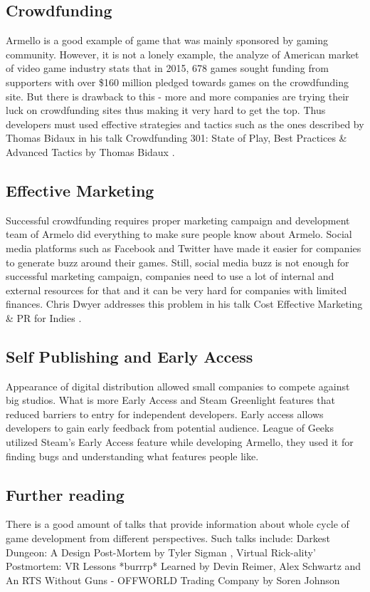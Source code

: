 \documentclass[a4paper]{article}
\begin{document}
\subsection{Crowdfunding}
Armello is a good example of game that was mainly sponsored by gaming community. However, it is not a lonely example, the analyze of American market of video game industry \cite{report} stats that in 2015, 678 games sought funding from supporters with over \$160 million pledged towards games on the crowdfunding site. But there is drawback to this - more and more companies are trying their luck on crowdfunding sites thus making it very hard to get the top. Thus developers must used effective strategies and tactics such as the ones described by Thomas Bidaux in his talk Crowdfunding 301: State of Play, Best Practices & Advanced Tactics by Thomas Bidaux \cite{talk0}.
\subsection{Effective Marketing}
Successful crowdfunding requires proper marketing campaign and development team of Armelo did everything to make sure people know about Armelo. Social media platforms such as Facebook and Twitter have made it easier for companies to generate buzz around their games. Still, social media buzz is not enough for successful marketing campaign, companies need to use a lot of internal and external resources for that and it can be very hard for companies with limited finances. Chris Dwyer addresses this problem in his talk Cost Effective Marketing & PR for Indies \cite{talk1}. 
\subsection{Self Publishing and Early Access}
Appearance of digital distribution allowed small companies to compete against big studios. What is more Early Access and Steam Greenlight features that reduced barriers to entry for
independent developers. Early access allows developers to gain early feedback from potential audience.  League of Geeks utilized Steam's Early Access feature while developing Armello, they used it for finding bugs and understanding what features people like.  
\subsection{Further reading}
There is a good amount of talks that provide information about whole cycle of game development from different perspectives. Such talks include: Darkest Dungeon: A Design Post-Mortem by Tyler Sigman \cite{talk2}, Virtual Rick-ality' Postmortem: VR Lessons *burrrp* Learned by Devin Reimer, Alex Schwartz \cite{talk3} and An RTS Without Guns - OFFWORLD Trading Company by Soren Johnson 
\end{document}
